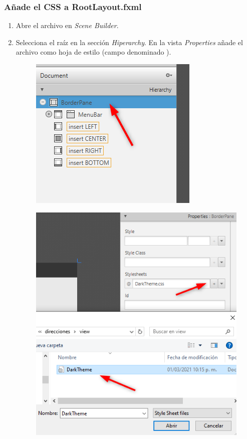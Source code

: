 \subsubsection*{Añade el CSS a RootLayout.fxml}
\begin{enumerate}
    \item Abre el archivo  en \textit{Scene Builder}.
    \item Selecciona el  raíz en la sección \textit{Hiperarchy}. En la vista \textit{Properties} añade 
    el archivo  como hoja de estilo (campo denominado ).
    \begin{figure}[H]
        \includegraphics{img/6-1-Hierachy.png}
    \end{figure}
    \begin{figure}[H]
        \includegraphics{img/6-2-SelectCSS.png}
    \end{figure}
\end{enumerate}

